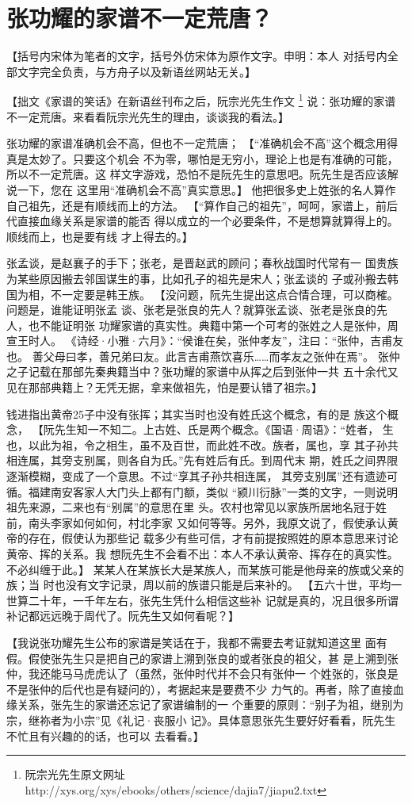 \chapter{张功耀的家谱不一定荒唐？}

【括号内宋体为笔者的文字，括号外仿宋体为原作文字。申明：本人
对括号内全部文字完全负责，与方舟子以及新语丝网站无关。】

【拙文《家谱的笑话》在新语丝刊布之后，阮宗光先生作文
\footnote{阮宗光先生原文网址 http://xys.org/xys/ebooks/others/science/dajia7/jiapu2.txt}
说：张功耀的家谱不一定荒唐。来看看阮宗光先生的理由，谈谈我的看法。】

\fangsong
张功耀的家谱准确机会不高，但也不一定荒唐；
\normalfont【“准确机会不高”这个概念用得真是太妙了。只要这个机会
不为零，哪怕是无穷小，理论上也是有准确的可能，所以不一定荒唐。这
样文字游戏，恐怕不是阮先生的意思吧。阮先生是否应该解说一下，您在
这里用“准确机会不高”真实意思。】
\fangsong
他把很多史上姓张的名人算作自己祖先，还是有顺线而上的方法。
\normalfont
【“算作自己的祖先”，呵呵，家谱上，前后代直接血缘关系是家谱的能否
得以成立的一个必要条件，不是想算就算得上的。顺线而上，也是要有线
才上得去的。】

\fangsong
张孟谈，是赵襄子的手下；张老，是晋赵武的顾问；春秋战国时代常有一
国贵族为某些原因搬去邻国谋生的事，比如孔子的祖先是宋人；张孟谈的
子或孙搬去韩国为相，不一定要是韩王族。
\normalfont
【没问题，阮先生提出这点合情合理，可以商榷。问题是，谁能证明张孟
谈、张老是张良的先人？就算张孟谈、张老是张良的先人，也不能证明张
功耀家谱的真实性。典籍中第一个可考的张姓之人是张仲，周宣王时人。
《诗经·小雅·六月》：“侯谁在矣，张仲孝友”，注曰：“张仲，吉甫友也。
善父母曰孝，善兄弟曰友。此言吉甫燕饮喜乐……而孝友之张仲在焉”。
张仲之子记载在那部先秦典籍当中？张功耀的家谱中从挥之后到张仲一共
五十余代又见在那部典籍上？无凭无据，拿来做祖先，怕是要认错了祖宗。】

\fangsong
钱进指出黄帝25子中没有张挥；其实当时也没有姓氏这个概念，有的是
族这个概念，
\normalfont
【阮先生知一不知二。上古姓、氏是两个概念。《国语·周语》：“姓者，
生也，以此为祖，令之相生，虽不及百世，而此姓不改。族者，属也，享
其子孙共相连属，其旁支别属，则各自为氏。”先有姓后有氏。到周代末
期，姓氏之间界限逐渐模糊，变成了一个意思。不过“享其子孙共相连属，
其旁支别属”还有遗迹可循。福建南安客家人大门头上都有门额，类似
“颍川衍脉”一类的文字，一则说明祖先来源，二来也有“别属”的意思在里
头。农村也常见以家族所居地名冠于姓前，南头李家如何如何，村北李家
又如何等等。另外，我原文说了，假使承认黄帝的存在，假使认为那些记
载多少有些可信，才有前提按照姓的原本意思来讨论黄帝、挥的关系。我
想阮先生不会看不出：本人不承认黄帝、挥存在的真实性。不必纠缠于此。】
\fangsong
某某人在某族长大是某族人，而某族可能是他母亲的族或父亲的族；当
时也没有文字记录，周以前的族谱只能是后来补的。
\normalfont
【五六十世，平均一世算二十年，一千年左右，张先生凭什么相信这些补
记就是真的，况且很多所谓补记都远远晚于周代了。阮先生又如何看呢？】

【我说张功耀先生公布的家谱是笑话在于，我都不需要去考证就知道这里
面有假。假使张先生只是把自己的家谱上溯到张良的或者张良的祖父，甚
是上溯到张仲，我还能马马虎虎认了（虽然，张仲时代并不会只有张仲一
个姓张的，张良是不是张仲的后代也是有疑问的），考据起来是要费不少
力气的。再者，除了直接血缘关系，张先生的家谱还忘记了家谱编制的一
个重要的原则：“别子为祖，继别为宗，继祢者为小宗”见《礼记·丧服小
记》。具体意思张先生要好好看看，阮先生不忙且有兴趣的的话，也可以
去看看。】
